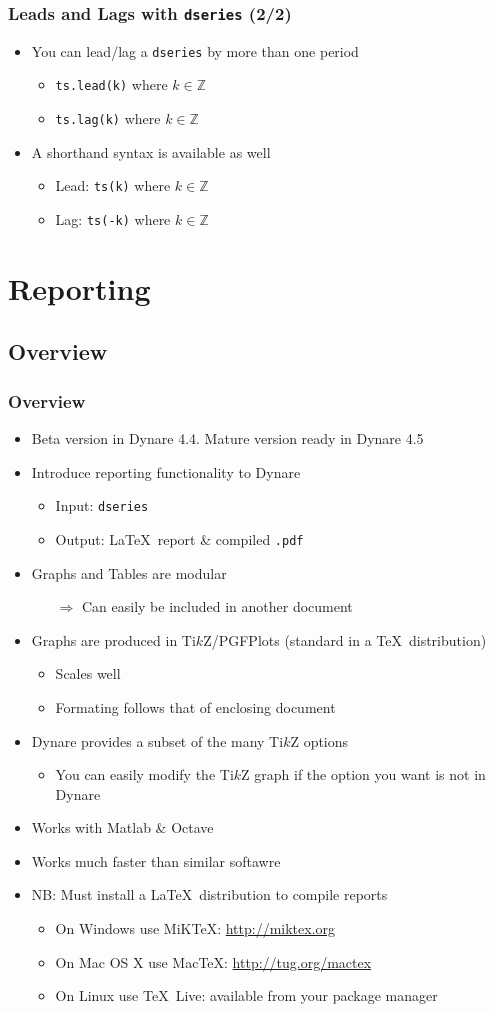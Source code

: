 \documentclass[10pt]{beamer}
\newcommand{\myitem}{\item[$\bullet$]}
\begin{document}
\begin{frame}[fragile,t]
  \frametitle{Leads and Lags with \texttt{dseries} (2/2)}
  \begin{itemize}
    \myitem You can lead/lag a \texttt{dseries} by more than one period
    \begin{itemize}
      \myitem \texttt{ts.lead(k)} where $k\in\mathbb{Z}$
      \myitem \texttt{ts.lag(k)} where $k\in\mathbb{Z}$
    \end{itemize}
    \myitem A shorthand syntax is available as well
    \begin{itemize}
      \myitem Lead: \texttt{ts(k)} where $k\in\mathbb{Z}$
      \myitem Lag: \texttt{ts(-k)} where $k\in\mathbb{Z}$
    \end{itemize}
  \end{itemize}
\end{frame}




%
%
\section{Reporting}
\subsection{Overview}
\begin{frame}[fragile,t]
  \frametitle{Overview}
  \begin{itemize}
  \myitem Beta version in Dynare 4.4. Mature version ready in Dynare 4.5
  \myitem Introduce reporting functionality to Dynare
      \begin{itemize}
      \myitem Input: \texttt{dseries}
      \myitem Output: \LaTeX\ report \& compiled \texttt{.pdf}
      \end{itemize}
    \myitem Graphs and Tables are modular
      \begin{itemize}
      \item[$\Rightarrow$] Can easily be included in another document
      \end{itemize}
    \myitem Graphs are produced in Ti$k$Z/PGFPlots (standard in a \TeX\ distribution)
      \begin{itemize}
      \myitem Scales well
      \myitem Formating follows that of enclosing document
      \end{itemize}
    \myitem Dynare provides a subset of the many Ti$k$Z options
      \begin{itemize}
      \myitem You can easily modify the Ti$k$Z graph if the option you want is not in Dynare
      \end{itemize}
    \myitem Works with Matlab \& Octave
    \myitem Works much faster than similar softawre
    \myitem NB: Must install a \LaTeX\ distribution to compile reports
      \begin{itemize}
      \myitem On Windows use MiKTeX: \url{http://miktex.org}
      \myitem On Mac OS X use MacTeX: \url{http://tug.org/mactex}
      \myitem On Linux use \TeX\ Live: available from your package manager
      \end{itemize}
  \end{itemize}
\end{frame}
\end{document}
